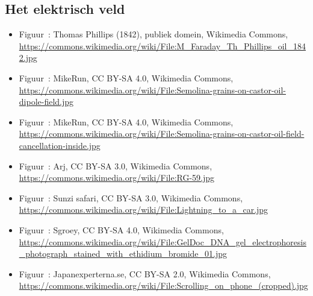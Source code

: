 \documentclass{ximera}
\begin{document}
\subsection*{Het elektrisch veld}
\begin{itemize}
        \item Figuur~: Thomas Phillips (1842), publiek domein, Wikimedia Commons, \url{https://commons.wikimedia.org/wiki/File:M_Faraday_Th_Phillips_oil_1842.jpg}
        \item Figuur~: MikeRun, CC BY-SA 4.0, Wikimedia Commons, \url{https://commons.wikimedia.org/wiki/File:Semolina-grains-on-castor-oil-dipole-field.jpg}
        \item Figuur~: MikeRun, CC BY-SA 4.0, Wikimedia Commons, \url{https://commons.wikimedia.org/wiki/File:Semolina-grains-on-castor-oil-field-cancellation-inside.jpg}
        \item Figuur~: Arj, CC BY-SA 3.0, Wikimedia Commons, \url{https://commons.wikimedia.org/wiki/File:RG-59.jpg}
        \item Figuur~: Sunzi safari, CC BY-SA 3.0, Wikimedia Commons, \url{https://commons.wikimedia.org/wiki/File:Lightning_to_a_car.jpg}
        \item Figuur~: Sgroey, CC BY-SA 4.0, Wikimedia Commons, \url{https://commons.wikimedia.org/wiki/File:GelDoc_DNA_gel_electrophoresis_photograph_stained_with_ethidium_bromide_01.jpg}
        \item Figuur~: Japanexperterna.se, CC BY-SA 2.0, Wikimedia Commons, \url{https://commons.wikimedia.org/wiki/File:Scrolling_on_phone_(cropped).jpg}
\end{itemize}
\end{document}
